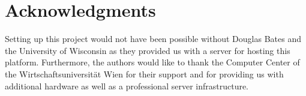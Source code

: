 \section{Acknowledgments}

Setting up this project would not have been possible without Douglas
Bates and the University of Wisconsin as they provided us with a
server for hosting this platform. Furthermore, 
the authors would like to thank the Computer Center 
of the Wirtschaftsuniversit\"at Wien for
their support and for providing us with additional hardware as well as a
professional server infrastructure.


